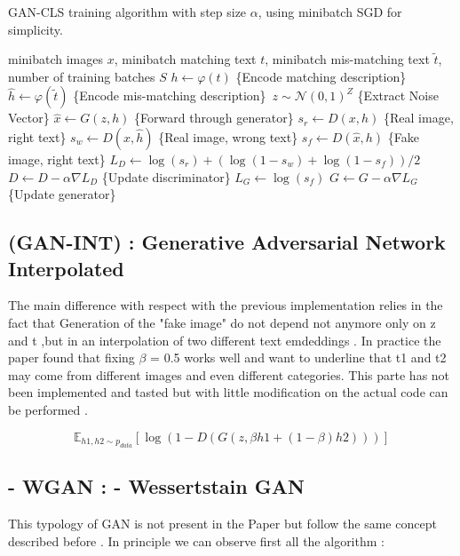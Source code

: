 \begin{algorithm}
    \caption{GAN-CLS training algorithm with step size $\alpha$, using minibatch SGD for simplicity.}
    \begin{algorithmic}
        \Require minibatch images $x$, minibatch matching text $t$, minibatch mis-matching text $\tilde{t}$, 
        number of training batches $S$
            \State $h \leftarrow \varphi(t)$ \hfill \{Encode matching description\}
            \State $\hat{h} \leftarrow \varphi(\tilde{t})$ \hfill \{Encode mis-matching description\}\
            \State $z \sim \mathcal{N}(0, 1)^Z$ \hfill \{Extract Noise Vector\}
            \State $\hat{x} \leftarrow G(z, h)$ \hfill \{Forward through generator\}
            \State $s_r \leftarrow D(x, h)$ \hfill \{Real image, right text\}
            \State $s_w \leftarrow D(x, \hat{h})$ \hfill \{Real image, wrong text\}
            \State $s_f \leftarrow D(\hat{x}, h)$ \hfill \{Fake image, right text\}
            \State $L_D \leftarrow \log(s_r) + \left(\log(1 - s_w) + \log(1 - s_f)\right) / 2$
            \State $D \leftarrow D - \alpha \nabla L_D$ \hfill \{Update discriminator\}
            \State $L_G \leftarrow \log(s_f)$
            \State $G \leftarrow G - \alpha \nabla L_G$ \hfill \{Update generator\}
        \EndFor
    \end{algorithmic}
\end{algorithm}


\subsection*{(GAN-INT) :  Generative Adversarial Network Interpolated}
The main difference with respect with the previous implementation relies 
in the fact that Generation of the "fake image" do not depend not anymore 
only on z and t ,but in an interpolation of two different text emdeddings .
In practice the paper found that fixing ${\beta}$ = 0.5 works well and want to
underline that t1 and t2 may come from different images and 
even different categories.
This parte has not been implemented and tasted but with little modification
on the actual code can be performed . 


\begin{equation}
    \mathbb{E}_{h1,h2 \sim p_{data} } [\log( 1 - D(G( z , \beta h1 + 
    (1-\beta) h2 )))]
\end{equation}

\subsection*{- WGAN : - Wessertstain GAN}
This typology of GAN is not present in the Paper but follow the same concept 
described before . 
In principle we can observe first all the algorithm :

